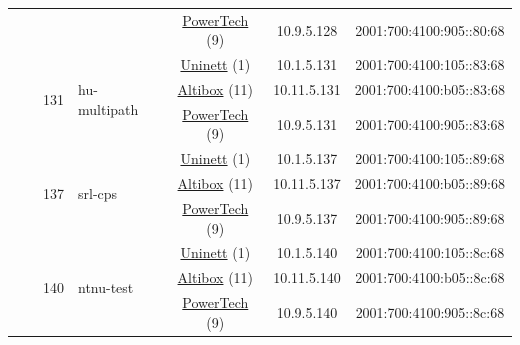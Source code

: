 \begin{small}
\begin{center}
\begin{longtable}{|c|c|c|c|c|c|c|c|}
  &  &  &  & \multicolumn{2}{|c|}{\tiny{\href{http://www.powertech.no}{PowerTech} (9)}} & \tiny{10.9.5.128} & \tiny{2001:700:4100:905::80:68} \\* \cline{3-3}\cline{4-4}\cline{5-5}\cline{6-6}\cline{7-7}\cline{8-8}
  &  & \multirow{3}{*}{\tiny{131}} & \multicolumn{1}{|l|}{\multirow{3}{*}{\tiny{hu-multipath}}} & \multicolumn{2}{|c|}{\tiny{\href{https://www.uninett.no}{Uninett} (1)}} & \tiny{10.1.5.131} & \tiny{2001:700:4100:105::83:68} \\* \cline{5-5}\cline{6-6}\cline{7-7}\cline{8-8}
  &  &  &  & \multicolumn{2}{|c|}{\tiny{\href{https://www.altibox.no}{Altibox} (11)}} & \tiny{10.11.5.131} & \tiny{2001:700:4100:b05::83:68} \\* \cline{5-5}\cline{6-6}\cline{7-7}\cline{8-8}
  &  &  &  & \multicolumn{2}{|c|}{\tiny{\href{http://www.powertech.no}{PowerTech} (9)}} & \tiny{10.9.5.131} & \tiny{2001:700:4100:905::83:68} \\* \cline{3-3}\cline{4-4}\cline{5-5}\cline{6-6}\cline{7-7}\cline{8-8}
  &  & \multirow{3}{*}{\tiny{137}} & \multicolumn{1}{|l|}{\multirow{3}{*}{\tiny{srl-cps}}} & \multicolumn{2}{|c|}{\tiny{\href{https://www.uninett.no}{Uninett} (1)}} & \tiny{10.1.5.137} & \tiny{2001:700:4100:105::89:68} \\* \cline{5-5}\cline{6-6}\cline{7-7}\cline{8-8}
  &  &  &  & \multicolumn{2}{|c|}{\tiny{\href{https://www.altibox.no}{Altibox} (11)}} & \tiny{10.11.5.137} & \tiny{2001:700:4100:b05::89:68} \\* \cline{5-5}\cline{6-6}\cline{7-7}\cline{8-8}
  &  &  &  & \multicolumn{2}{|c|}{\tiny{\href{http://www.powertech.no}{PowerTech} (9)}} & \tiny{10.9.5.137} & \tiny{2001:700:4100:905::89:68} \\* \cline{3-3}\cline{4-4}\cline{5-5}\cline{6-6}\cline{7-7}\cline{8-8}
  &  & \multirow{3}{*}{\tiny{140}} & \multicolumn{1}{|l|}{\multirow{3}{*}{\tiny{ntnu-test}}} & \multicolumn{2}{|c|}{\tiny{\href{https://www.uninett.no}{Uninett} (1)}} & \tiny{10.1.5.140} & \tiny{2001:700:4100:105::8c:68} \\* \cline{5-5}\cline{6-6}\cline{7-7}\cline{8-8}
  &  &  &  & \multicolumn{2}{|c|}{\tiny{\href{https://www.altibox.no}{Altibox} (11)}} & \tiny{10.11.5.140} & \tiny{2001:700:4100:b05::8c:68} \\* \cline{5-5}\cline{6-6}\cline{7-7}\cline{8-8}
  &  &  &  & \multicolumn{2}{|c|}{\tiny{\href{http://www.powertech.no}{PowerTech} (9)}} & \tiny{10.9.5.140} & \tiny{2001:700:4100:905::8c:68} \\* \cline{3-3}\cline{4-4}\cline{5-5}\cline{6-6}\cline{7-7}\cline{8-8}

\end{longtable}
\end{center}
\end{small}
